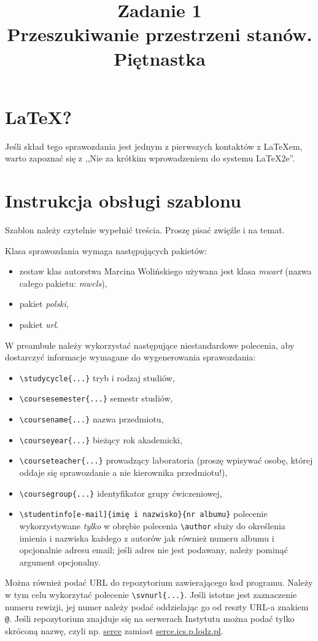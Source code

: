 \documentclass{classrep}
\author{
  \studentinfo{Natalia Mateuszuk}{203940} \and
  \studentinfo{Adrian Grzelak}{200242}
}
\title{Zadanie 1 \\
Przeszukiwanie przestrzeni stanów. Piętnastka}
\begin{document}
\maketitle

\section{\LaTeX?}
Jeśli skład tego sprawozdania jest jednym z pierwszych kontaktów z
\LaTeX\dywiz em, warto zapoznać się z ,,Nie za krótkim wprowadzeniem do
systemu \LaTeX2e''\cite{l2short}.

\section{Instrukcja obsługi szablonu}
Szablon należy czytelnie wypełnić treścia. Proszę pisać zwięźle i na temat.

Klasa sprawozdania wymaga następujących pakietów:
\begin{itemize}
  \item zestaw klas autorstwa Marcina Wolińskiego \ppauza używana jest klasa
    \emph{mwart} (nazwa całego pakietu: \emph{mwcls}),
  \item pakiet \emph{polski},
  \item pakiet \emph{url}.
\end{itemize}

W preambule należy wykorzystać następujące niestandardowe polecenia, aby
dostarczyć informacje wymagane do wygenerowania sprawozdania:
\begin{itemize}
  \item \verb+\studycycle{...}+ \ppauza tryb i rodzaj studiów,
  \item \verb+\coursesemester{...}+ \ppauza semestr studiów,
  \item \verb+\coursename{...}+ \ppauza nazwa przedmiotu,
  \item \verb+\courseyear{...}+ \ppauza bieżący rok akademicki,
  \item \verb+\courseteacher{...}+ \ppauza prowadzący laboratoria (proszę
    wpisywać osobę, której oddaje się sprawozdanie a nie kierownika
    przedmiotu!),
  \item \verb+\coursegroup{...}+ \ppauza identyfikator grupy ćwiczeniowej,
  \item \verb+\studentinfo[e-mail]{imię i nazwisko}{nr albumu}+ \ppauza
    polecenie wykorzystywane \emph{tylko} w obrębie polecenia \verb+\author+
    służy do określenia imienia i nazwiska każdego z autorów jak również
    numeru albumu i opcjonalnie adresu e\dywiz mail; jeśli adres nie jest
    podawany, należy pominąć argument opcjonalny.
\end{itemize}
Można również podać URL do repozytorium zawierającego kod programu. Należy w
tym celu wykorzytać polecenie \verb+\svnurl{...}+. Jeśli istotne jest
zaznaczenie numeru rewizji, jej numer należy podać oddzielając go od reszty
URL-a znakiem \verb+@+. Jeśli repozytorium znajduje się na serwerach Instytutu
można podać tylko skróconą nazwę, czyli np. \url{serce} zamiast
\url{serce.ics.p.lodz.pl}.
\end{document}
